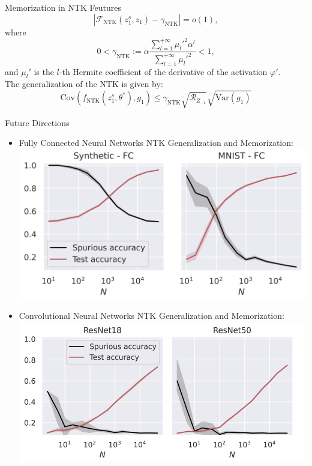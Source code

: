 \documentclass[serif, aspectratio=169]{beamer}
\begin{document}
\begin{frame}{Memorization in NTK Feutures}
	\[
	\left| \mathcal{F}_{\text{NTK}}(z_1^s, z_1) - \gamma_{\text{NTK}} \right| = o(1),
	\]
	where 
	\[
	0 < \gamma_{\text{NTK}} := \alpha \frac{\sum_{l=1}^{+\infty} \mu_l'^2 \alpha^l}{\sum_{l=1}^{+\infty} \mu_l'^2} < 1, \tag{26}
	\]
	and $\mu_l'$ is the $l$-th Hermite coefficient of the derivative of the activation $\varphi'$.\\
	The generalization of the NTK is given by:
	\[
	\text{Cov}\left(f_{\text{NTK}}(z_1^s, \theta^*), g_1\right) \leq \gamma_{\text{NTK}} \sqrt{\mathcal{R}_{Z_{-1}}} \sqrt{\text{Var}(g_1)}
	\]
\end{frame}
\begin{frame}{Future Directions}
	\begin{itemize}
		\item Fully Connected Neural Networks NTK Generalization and Memorization:
		\centering
		\includegraphics[keepaspectratio, scale=0.5]{pic/FC.png}
		\item Convolutional Neural Networks NTK Generalization and Memorization:
		\centering
		\includegraphics[keepaspectratio, scale=0.5]{pic/CNN.png}
	\end{itemize}
\end{frame}
\end{document}
